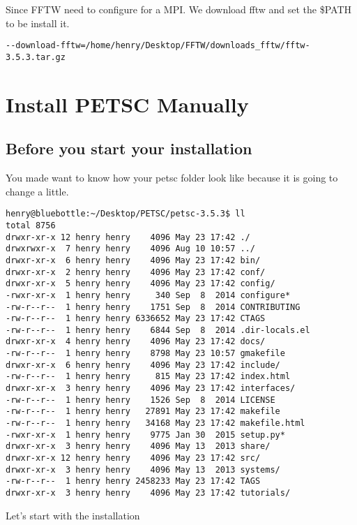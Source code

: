 \documentclass{article}
\begin{document}
Since FFTW need to configure for a MPI. We download fftw and set the \$PATH to be install it.  
\begin{verbatim}
--download-fftw=/home/henry/Desktop/FFTW/downloads_fftw/fftw-3.5.3.tar.gz
\end{verbatim}

\section{Install PETSC Manually}
\subsection{Before you start your installation} You made want to know how your petsc folder look like because it is going to change a little.
\begin{scriptsize}\begin{verbatim}
henry@bluebottle:~/Desktop/PETSC/petsc-3.5.3$ ll
total 8756
drwxr-xr-x 12 henry henry    4096 May 23 17:42 ./
drwxrwxr-x  7 henry henry    4096 Aug 10 10:57 ../
drwxr-xr-x  6 henry henry    4096 May 23 17:42 bin/
drwxr-xr-x  2 henry henry    4096 May 23 17:42 conf/
drwxr-xr-x  5 henry henry    4096 May 23 17:42 config/
-rwxr-xr-x  1 henry henry     340 Sep  8  2014 configure*
-rw-r--r--  1 henry henry    1751 Sep  8  2014 CONTRIBUTING
-rw-r--r--  1 henry henry 6336652 May 23 17:42 CTAGS
-rw-r--r--  1 henry henry    6844 Sep  8  2014 .dir-locals.el
drwxr-xr-x  4 henry henry    4096 May 23 17:42 docs/
-rw-r--r--  1 henry henry    8798 May 23 10:57 gmakefile
drwxr-xr-x  6 henry henry    4096 May 23 17:42 include/
-rw-r--r--  1 henry henry     815 May 23 17:42 index.html
drwxr-xr-x  3 henry henry    4096 May 23 17:42 interfaces/
-rw-r--r--  1 henry henry    1526 Sep  8  2014 LICENSE
-rw-r--r--  1 henry henry   27891 May 23 17:42 makefile
-rw-r--r--  1 henry henry   34168 May 23 17:42 makefile.html
-rwxr-xr-x  1 henry henry    9775 Jan 30  2015 setup.py*
drwxr-xr-x  3 henry henry    4096 May 13  2013 share/
drwxr-xr-x 12 henry henry    4096 May 23 17:42 src/
drwxr-xr-x  3 henry henry    4096 May 13  2013 systems/
-rw-r--r--  1 henry henry 2458233 May 23 17:42 TAGS
drwxr-xr-x  3 henry henry    4096 May 23 17:42 tutorials/
\end{verbatim}\end{scriptsize}
Let's start with the installation
\end{document}
